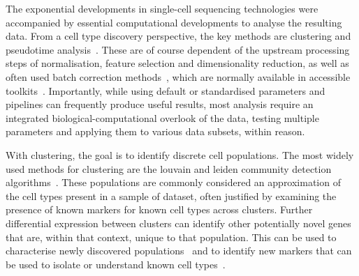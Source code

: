 The exponential developments in single-cell sequencing technologies were accompanied by essential computational developments to analyse the resulting data. From a cell type discovery perspective, the key methods are clustering and pseudotime analysis~\citep{rostom_computational_2017}. These are of course dependent of the upstream processing steps of normalisation, feature selection and dimensionality reduction, as well as often used batch correction methods~\citep{luecken_current_2019}, which are normally available in accessible toolkits~\citep{mccarthy_scater:_2017,butler_integrating_2018,wolf_scanpy:_2018}. Importantly, while using default or standardised parameters and pipelines can frequently produce useful results, most analysis require an integrated biological-computational overlook of the data, testing multiple parameters and applying them to various data subsets, within reason. 

With clustering, the goal is to identify discrete cell populations. The most widely used methods for clustering are the louvain and leiden community detection algorithms~\citep{blondel_fast_2008,traag_louvain_2019}. These populations are commonly considered an approximation of the cell types present in a sample of dataset, often justified by examining the presence of known markers for known cell types across clusters. Further differential expression between clusters can identify other potentially novel genes that are, within that context, unique to that population. This can be used to characterise newly discovered populations~\citep{villani_single-cell_2017,montoro_revised_2018,shekhar_comprehensive_2016} and to identify new markers that can be used to isolate or understand known cell types~\citep{shulse_high-throughput_2019,vento-tormo_single-cell_2018,bjorklund_heterogeneity_2016}.

